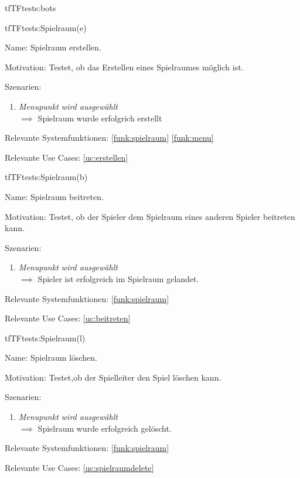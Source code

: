 \begin{description}[leftmargin=5em, style=sameline]
\begin{lhp}{tf}{TF}{tests:bots}
\end{lhp}

\begin{lhp}{tf}{TF}{tests:Spielraum(e)}
	\item [Name:] Spielraum erstellen.
	\item [Motivation:] Testet, ob das Erstellen eines Spielraumes möglich ist.
	\item [Szenarien:] \hfill
		\begin{enumerate}
			\item \textit{Menupunkt wird ausgewählt} \\ $\implies$ Spielraum wurde erfolgrich erstellt
		\end{enumerate}
	\item [Relevante Systemfunktionen:] \ref{funk:spielraum} \ref{funk:menu}
	\item [Relevante Use Cases:] \ref{uc:erstellen}
		
\end{lhp}

\begin{lhp}{tf}{TF}{tests:Spielraum(b)}
	\item [Name:] Spielraum beitreten.
	\item [Motivation:] Testet, ob der Spieler dem Spielraum eines anderen Spieler beitreten kann.
	\item [Szenarien:] \hfill
		\begin{enumerate}
			\item \textit{Menupunkt wird ausgewählt} \\ $\implies$ Spieler ist erfolgreich im Spielraum gelandet.
		\end{enumerate}
		\item [Relevante Systemfunktionen:] \ref{funk:spielraum}
	\item [Relevante Use Cases:] \ref{uc:beitreten}
		
\end{lhp}

\begin{lhp}{tf}{TF}{tests:Spielraum(l)}
	\item [Name:] Spielraum löschen.
	\item [Motivation:] Testet,ob der Spielleiter den Spiel löschen kann.
	\item [Szenarien:] \hfill
		\begin{enumerate}
			\item \textit{Menupunkt wird ausgewählt} \\ $\implies$ Spielraum wurde erfolgreich gelöscht.
		\end{enumerate}
	\item [Relevante Systemfunktionen:] \ref{funk:spielraum}
	\item [Relevante Use Cases:] \ref{uc:spielraumdelete}


\end{lhp}
\end{description}

